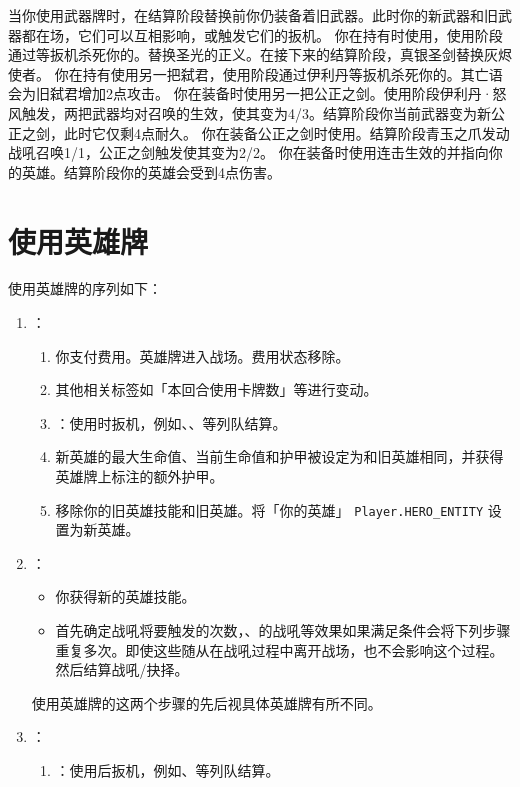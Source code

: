 当你使用武器牌时，在结算阶段替换前你仍装备着旧武器。此时你的新武器和旧武器都在场，它们可以互相影响，或触发它们的扳机。
\example 你在持有时使用，使用阶段通过等扳机杀死你的。替换圣光的正义。在接下来的结算阶段，真银圣剑替换灰烬使者。
\example 你在持有使用另一把弑君，使用阶段通过伊利丹等扳机杀死你的。其亡语会为旧弑君增加2点攻击。
\example 你在装备时使用另一把公正之剑。使用阶段伊利丹·怒风触发，两把武器均对召唤的生效，使其变为4/3。结算阶段你当前武器变为新公正之剑，此时它仅剩4点耐久。
\example 你在装备公正之剑时使用。结算阶段青玉之爪发动战吼召唤1/1，公正之剑触发使其变为2/2。
\example 你在装备时使用连击生效的并指向你的英雄。结算阶段你的英雄会受到4点伤害。
​
\section{使用英雄牌}

使用英雄牌的序列如下：

\begin{enumerate}
    \item {}：
    \begin{enumerate}
        \item 你支付费用。英雄牌进入战场。费用状态移除。
        \item 其他相关标签如「本回合使用卡牌数」等进行变动。
        \item {}：使用时扳机，例如、、等列队结算。
        \item 新英雄的最大生命值、当前生命值和护甲被设定为和旧英雄相同，并获得英雄牌上标注的额外护甲。
        \item 移除你的旧英雄技能和旧英雄。将「你的英雄」 \texttt{Player.HERO\_ENTITY} 设置为新英雄。
    \end{enumerate}

    \item {}：
    \begin{itemize}
        \item 你获得新的英雄技能。
        \item 首先确定战吼将要触发的次数，、的战吼等效果如果满足条件会将下列步骤重复多次。即使这些随从在战吼过程中离开战场，也不会影响这个过程。然后结算战吼/抉择。
    \end{itemize}
    \notice 使用英雄牌的这两个步骤的先后视具体英雄牌有所不同。

    \item {}：
    \begin{enumerate}
        \item {}：使用后扳机，例如、等列队结算。
    \end{enumerate}
\end{enumerate}

